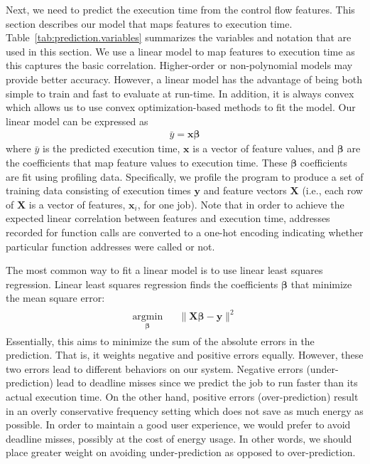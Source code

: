 Next, we need to predict the execution time from the control flow features.  This section
describes our model that maps features to execution time.
Table~\ref{tab:prediction.variables} summarizes the variables and
notation that are used in this section. 
We use a linear model to map features to execution time as this captures the
basic correlation. 
Higher-order or non-polynomial models may provide better accuracy.
However, a linear model has the advantage of being both simple to
train and fast to evaluate at run-time. In addition, it is always convex which
allows us to use convex optimization-based methods to fit the model.
Our linear model can be expressed as
\begin{align*}
  \bar{y} = \mathbf{x} \boldsymbol{\beta}
\end{align*}
where $\bar{y}$ is the predicted execution time, $\mathbf{x}$ is a vector of
feature values, and $\boldsymbol{\beta}$ are the coefficients that map feature
values to execution time. These $\boldsymbol{\beta}$ coefficients are
fit using profiling data. Specifically, we profile the program to
produce a set of training data consisting of execution times $\mathbf{y}$ and
feature vectors $\mathbf{X}$ (i.e., each row of $\mathbf{X}$ is a vector of
features, $\mathbf{x}_i$, for one job). Note that in order to achieve the expected linear
correlation between features and execution time, addresses recorded for
function calls are converted to a one-hot encoding indicating whether particular
function addresses were called or not.

The most common way to fit a linear model is to use linear least squares regression.
Linear least squares regression finds the coefficients $\boldsymbol{\beta}$ that minimize the mean
square error:
\begin{align*}
\begin{aligned}
  \underset{\boldsymbol{\beta}}{\text{argmin}} & & \|\mathbf{X}\boldsymbol{\beta} - \textbf{y}\|^2
\end{aligned}
\end{align*}
Essentially, this aims to minimize the sum of the absolute errors in the
prediction. That is, it weights negative and positive errors equally. However,
these two errors lead to different behaviors on our system.
Negative errors (under-prediction) lead to deadline misses since we predict the
job to run faster than its actual execution time. On the other hand, positive errors
(over-prediction) result in an overly conservative frequency setting which does
not save as much energy as possible. In order to maintain a good user
experience, we would prefer to avoid deadline misses, possibly at the cost of
energy usage. In other words, we should place greater weight on avoiding
under-prediction as opposed to over-prediction.

